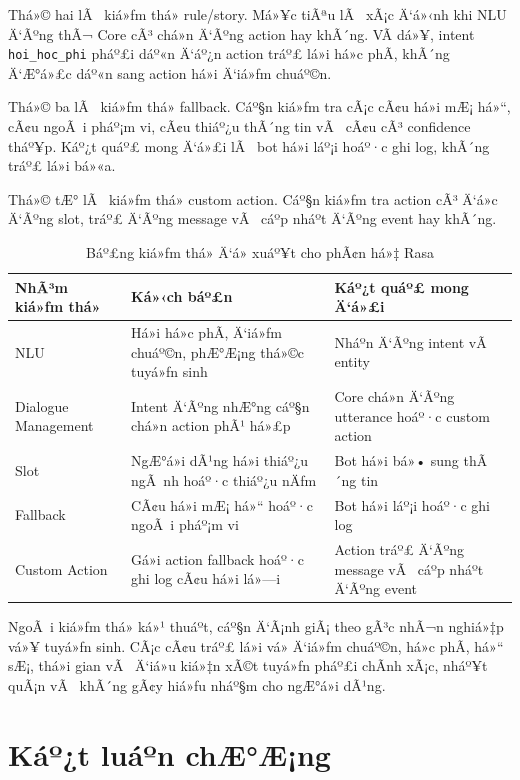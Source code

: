 ﻿\documentclass[12pt,a4paper]{report}
\begin{document}
Thá»© hai lÃ  kiá»ƒm thá»­ rule/story. Má»¥c tiÃªu lÃ  xÃ¡c Ä‘á»‹nh khi NLU Ä‘Ãºng thÃ¬ Core cÃ³ chá»n Ä‘Ãºng action hay khÃ´ng. VÃ­ dá»¥, intent \texttt{hoi\_hoc\_phi} pháº£i dáº«n Ä‘áº¿n action tráº£ lá»i há»c phÃ­, khÃ´ng Ä‘Æ°á»£c dáº«n sang action há»i Ä‘iá»ƒm chuáº©n.

Thá»© ba lÃ  kiá»ƒm thá»­ fallback. Cáº§n kiá»ƒm tra cÃ¡c cÃ¢u há»i mÆ¡ há»“, cÃ¢u ngoÃ i pháº¡m vi, cÃ¢u thiáº¿u thÃ´ng tin vÃ  cÃ¢u cÃ³ confidence tháº¥p. Káº¿t quáº£ mong Ä‘á»£i lÃ  bot há»i láº¡i hoáº·c ghi log, khÃ´ng tráº£ lá»i bá»«a.

Thá»© tÆ° lÃ  kiá»ƒm thá»­ custom action. Cáº§n kiá»ƒm tra action cÃ³ Ä‘á»c Ä‘Ãºng slot, tráº£ Ä‘Ãºng message vÃ  cáº­p nháº­t Ä‘Ãºng event hay khÃ´ng.

\begin{table}[H]
\centering
\begin{tabular}{|p{3.5cm}|p{4.5cm}|p{5cm}|}
\hline
\textbf{NhÃ³m kiá»ƒm thá»­} & \textbf{Ká»‹ch báº£n} & \textbf{Káº¿t quáº£ mong Ä‘á»£i} \\
\hline
NLU & Há»i há»c phÃ­, Ä‘iá»ƒm chuáº©n, phÆ°Æ¡ng thá»©c tuyá»ƒn sinh & Nháº­n Ä‘Ãºng intent vÃ  entity \\
\hline
Dialogue Management & Intent Ä‘Ãºng nhÆ°ng cáº§n chá»n action phÃ¹ há»£p & Core chá»n Ä‘Ãºng utterance hoáº·c custom action \\
\hline
Slot & NgÆ°á»i dÃ¹ng há»i thiáº¿u ngÃ nh hoáº·c thiáº¿u nÄƒm & Bot há»i bá»• sung thÃ´ng tin \\
\hline
Fallback & CÃ¢u há»i mÆ¡ há»“ hoáº·c ngoÃ i pháº¡m vi & Bot há»i láº¡i hoáº·c ghi log \\
\hline
Custom Action & Gá»i action fallback hoáº·c ghi log cÃ¢u há»i lá»—i & Action tráº£ Ä‘Ãºng message vÃ  cáº­p nháº­t Ä‘Ãºng event \\
\hline
\end{tabular}
\caption{Báº£ng kiá»ƒm thá»­ Ä‘á» xuáº¥t cho phÃ¢n há»‡ Rasa}
\label{tab:rasa-testing-plan}
\end{table}

NgoÃ i kiá»ƒm thá»­ ká»¹ thuáº­t, cáº§n Ä‘Ã¡nh giÃ¡ theo gÃ³c nhÃ¬n nghiá»‡p vá»¥ tuyá»ƒn sinh. CÃ¡c cÃ¢u tráº£ lá»i vá» Ä‘iá»ƒm chuáº©n, há»c phÃ­, há»“ sÆ¡, thá»i gian vÃ  Ä‘iá»u kiá»‡n xÃ©t tuyá»ƒn pháº£i chÃ­nh xÃ¡c, nháº¥t quÃ¡n vÃ  khÃ´ng gÃ¢y hiá»ƒu nháº§m cho ngÆ°á»i dÃ¹ng.



\section{Káº¿t luáº­n chÆ°Æ¡ng}
\end{document}
